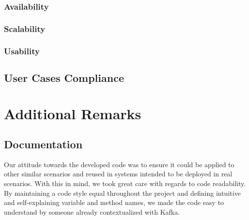 \documentclass[12pt]{article}
\begin{document}
\subsubsection{Availability}

\subsubsection{Scalability}

\subsubsection{Usability}

\subsection{User Cases Compliance} \label{compliance} %


\newpage
\section{Additional Remarks} \label{remarks} %

\subsection{Documentation} \label{documentation} %

Our attitude towards the developed code was to ensure it could be applied to other similar scenarios and reused in systems intended to be deployed in real scenarios.
With this in mind, we took great care with regards to code readability.
By maintaining a code style equal throughout the project and defining intuitive and self-explaining variable and method names, we made the code easy to understand
by someone already contextualized with Kafka.
\end{document}
